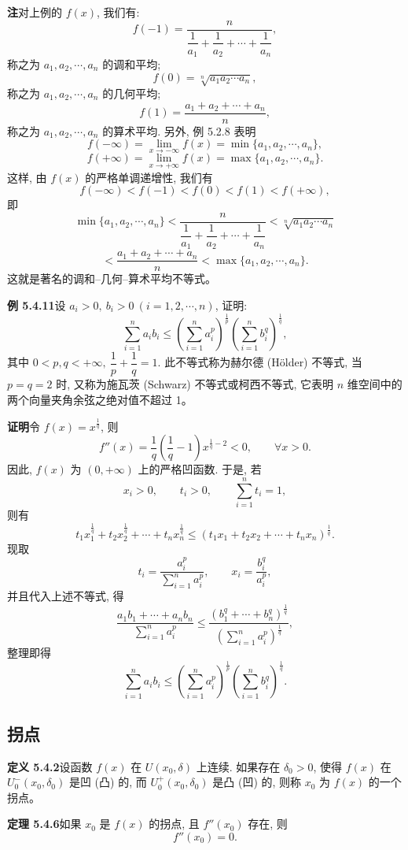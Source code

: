 \documentclass[UTF8, 12pt, fontset=fandol, oneside]{ctexart}
\begin{document}
\noindent\textbf{注}\quad 对上例的 $f(x)$, 我们有:
\[
  f(-1)=\frac{n}{\dfrac1{a_1}+\dfrac1{a_2}+\cdots+\dfrac1{a_n}},
\]
称之为 $a_1,a_2,\cdots,a_n$ 的调和平均;
\[
  f(0)=\sqrt[n]{a_1a_2\cdots a_n},
\]
称之为 $a_1,a_2,\cdots,a_n$ 的几何平均;
\[
  f(1)=\frac{a_1+a_2+\cdots+a_n}{n},
\]
称之为 $a_1,a_2,\cdots,a_n$ 的算术平均. 另外, 例 5.2.8 表明
\[
  f(-\infty)=\lim_{x\to-\infty}f(x)=\min\{a_1,a_2,\cdots,a_n\},
\]
\[
  f(+\infty)=\lim_{x\to+\infty}f(x)=\max\{a_1,a_2,\cdots,a_n\}.
\]
这样, 由 $f(x)$ 的严格单调递增性, 我们有
\[
  f(-\infty)<f(-1)<f(0)<f(1)<f(+\infty),
\]
即
\[
  \min\{a_1,a_2,\cdots,a_n\}
  <\frac{n}{\dfrac1{a_1}+\dfrac1{a_2}+\cdots+\dfrac1{a_n}}
  <\sqrt[n]{a_1a_2\cdots a_n}
\]
\[
  <\frac{a_1+a_2+\cdots+a_n}{n}
  <\max\{a_1,a_2,\cdots,a_n\}.
\]
这就是著名的调和--几何--算术平均不等式。

\noindent\textbf{例 5.4.11}\quad 设 $a_i>0,\ b_i>0\ (i=1,2,\cdots,n)$, 证明:
\[
  \sum_{i=1}^n a_i b_i
  \le
  \left(\sum_{i=1}^n a_i^p\right)^{\frac1p}
  \left(\sum_{i=1}^n b_i^q\right)^{\frac1q},
\]
其中 $0<p,q<+\infty,\ \dfrac1p+\dfrac1q=1$. 此不等式称为赫尔德 (H\"older) 不等式, 当 $p=q=2$ 时, 又称为施瓦茨 (Schwarz) 不等式或柯西不等式, 它表明 $n$ 维空间中的两个向量夹角余弦之绝对值不超过 1。

\noindent\textbf{证明}\quad 令 $f(x)=x^{\frac1q}$, 则
\[
  f''(x)=\frac1q\left(\frac1q-1\right)x^{\frac1q-2}<0,\qquad \forall x>0.
\]
因此, $f(x)$ 为 $(0,+\infty)$ 上的严格凹函数. 于是, 若
\[
  x_i>0,\qquad t_i>0,\qquad \sum_{i=1}^n t_i=1,
\]
则有
\[
  t_1x_1^{\frac1q}+t_2x_2^{\frac1q}+\cdots+t_nx_n^{\frac1q}
  \le (t_1x_1+t_2x_2+\cdots+t_nx_n)^{\frac1q}.
\]
现取
\[
  t_i=\frac{a_i^p}{\sum_{i=1}^n a_i^p},\qquad x_i=\frac{b_i^q}{a_i^p},
\]
并且代入上述不等式, 得
\[
  \frac{a_1b_1+\cdots+a_nb_n}{\sum_{i=1}^n a_i^p}
  \le
  \frac{(b_1^q+\cdots+b_n^q)^{\frac1q}}{\left(\sum_{i=1}^n a_i^p\right)^{\frac1q}},
\]
整理即得
\[
  \sum_{i=1}^n a_i b_i
  \le
  \left(\sum_{i=1}^n a_i^p\right)^{\frac1p}
  \left(\sum_{i=1}^n b_i^q\right)^{\frac1q}.
\]

\subsection{拐点}

\noindent\textbf{定义 5.4.2}\quad 设函数 $f(x)$ 在 $U(x_0,\delta)$ 上连续. 如果存在 $\delta_0>0$, 使得 $f(x)$ 在 $U_0^-(x_0,\delta_0)$ 是凹 (凸) 的, 而 $U_0^+(x_0,\delta_0)$ 是凸 (凹) 的, 则称 $x_0$ 为 $f(x)$ 的一个拐点。

\noindent\textbf{定理 5.4.6}\quad 如果 $x_0$ 是 $f(x)$ 的拐点, 且 $f''(x_0)$ 存在, 则
\[
  f''(x_0)=0.
\]
\end{document}
